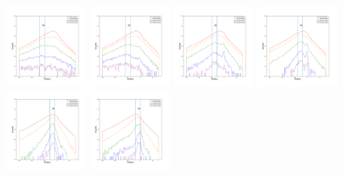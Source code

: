 \documentclass[12pt,prd]{article}
\begin{document}
\begin{figure}[h!]
\includegraphics[width=0.24\textwidth]{../figures/scanning_plotsgaiascan_l45_0_b82_2_ra201_5_dec28_5_npy_6.pdf}
\includegraphics[width=0.24\textwidth]{../figures/scanning_plotsgaiascan_l45_0_b82_2_ra201_5_dec28_5_npy_7.pdf}
\includegraphics[width=0.24\textwidth]{../figures/scanning_plotsgaiascan_l45_0_b82_2_ra201_5_dec28_5_npy_8.pdf}
\includegraphics[width=0.24\textwidth]{../figures/scanning_plotsgaiascan_l45_0_b82_2_ra201_5_dec28_5_npy_9.pdf}
\includegraphics[width=0.24\textwidth]{../figures/scanning_plotsgaiascan_l45_0_b82_2_ra201_5_dec28_5_npy_10.pdf}
\includegraphics[width=0.24\textwidth]{../figures/scanning_plotsgaiascan_l45_0_b82_2_ra201_5_dec28_5_npy_11.pdf}

\end{figure}
\end{document}
